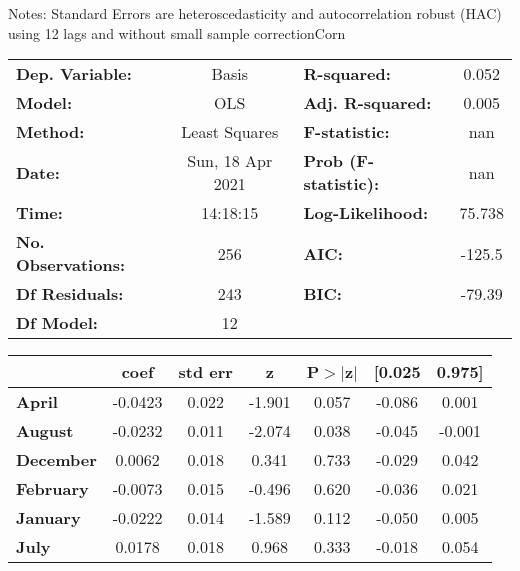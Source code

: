 Notes: \newline
 [1] Standard Errors are heteroscedasticity and autocorrelation robust (HAC) using 12 lags and without small sample correctionCorn\begin{center}
\begin{tabular}{lclc}
\toprule
\textbf{Dep. Variable:}    &      Basis       & \textbf{  R-squared:         } &     0.052   \\
\textbf{Model:}            &       OLS        & \textbf{  Adj. R-squared:    } &     0.005   \\
\textbf{Method:}           &  Least Squares   & \textbf{  F-statistic:       } &       nan   \\
\textbf{Date:}             & Sun, 18 Apr 2021 & \textbf{  Prob (F-statistic):} &      nan    \\
\textbf{Time:}             &     14:18:15     & \textbf{  Log-Likelihood:    } &    75.738   \\
\textbf{No. Observations:} &         256      & \textbf{  AIC:               } &    -125.5   \\
\textbf{Df Residuals:}     &         243      & \textbf{  BIC:               } &    -79.39   \\
\textbf{Df Model:}         &          12      & \textbf{                     } &             \\
\bottomrule
\end{tabular}
\begin{tabular}{lcccccc}
                   & \textbf{coef} & \textbf{std err} & \textbf{z} & \textbf{P$> |$z$|$} & \textbf{[0.025} & \textbf{0.975]}  \\
\midrule
\textbf{April}     &      -0.0423  &        0.022     &    -1.901  &         0.057        &       -0.086    &        0.001     \\
\textbf{August}    &      -0.0232  &        0.011     &    -2.074  &         0.038        &       -0.045    &       -0.001     \\
\textbf{December}  &       0.0062  &        0.018     &     0.341  &         0.733        &       -0.029    &        0.042     \\
\textbf{February}  &      -0.0073  &        0.015     &    -0.496  &         0.620        &       -0.036    &        0.021     \\
\textbf{January}   &      -0.0222  &        0.014     &    -1.589  &         0.112        &       -0.050    &        0.005     \\
\textbf{July}      &       0.0178  &        0.018     &     0.968  &         0.333        &       -0.018    &        0.054     \\

\end{tabular}
\end{center}
